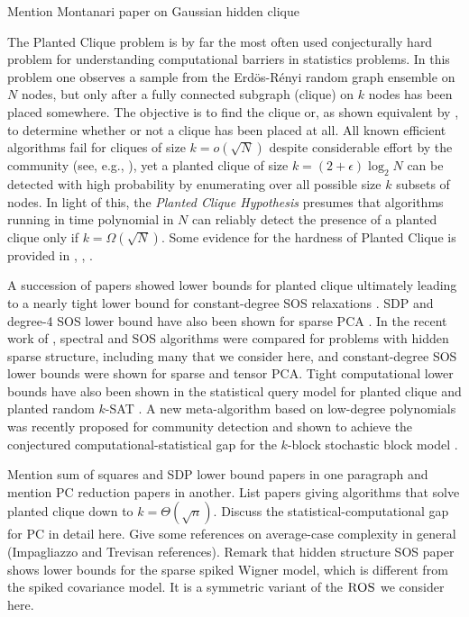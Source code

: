 \documentclass[11pt]{article}
\begin{document}
Mention Montanari paper on Gaussian hidden clique

The Planted Clique problem is by far the most often used conjecturally hard problem for understanding computational barriers in statistics problems. In this problem one observes a sample from the Erd\"{o}s-R\'{e}nyi random graph ensemble on $N$ nodes, but only after a fully connected subgraph (clique) on $k$ nodes has been placed somewhere. The objective is to find the clique or, as shown equivalent by \cite{alon2007testing}, to determine whether or not a clique has been placed at all. All known efficient algorithms fail for cliques of size $k=o(\sqrt{N})$ despite considerable effort by the community (see, e.g., \cite{alon1998finding,deshpande2015finding}), yet a planted clique of size $k = (2+\epsilon)\log_2 N$ can be detected with high probability by enumerating over all possible size $k$ subsets of nodes. In light of this, the \emph{Planted Clique Hypothesis} presumes that algorithms running in time polynomial in $N$ can reliably detect the presence of a planted clique only if $k = \Omega(\sqrt{ N})$. Some evidence for the hardness of Planted Clique is provided in \cite{feldman2013statistical}, \cite{deshpande2015improved}, \cite{barak2016nearly}.

A succession of papers showed lower bounds for planted clique ultimately leading to a nearly tight lower bound for constant-degree SOS relaxations \cite{raghavendra2015tight, meka2015sum, deshpande2015improved, hopkins2016integrality, barak2016nearly}. SDP and degree-4 SOS lower bound have also been shown for sparse PCA \cite{krauthgamer2015semidefinite, ma2015sum}. In the recent work of \cite{hopkins2017power}, spectral and SOS algorithms were compared for problems with hidden sparse structure, including many that we consider here, and constant-degree SOS lower bounds were shown for sparse and tensor PCA. Tight computational lower bounds have also been shown in the statistical query model for planted clique and planted random $k$-SAT \cite{feldman2012statistical, feldman2015complexity}. A new meta-algorithm based on low-degree polynomials was recently proposed for community detection and shown to achieve the conjectured computational-statistical gap for the $k$-block stochastic block model \cite{hopkins2017bayesian}.

Mention sum of squares and SDP lower bound papers in one paragraph and mention PC reduction papers in another. List papers giving algorithms that solve planted clique down to $k = \Theta(\sqrt{n})$. Discuss the statistical-computational gap for PC in detail here. Give some references on average-case complexity in general (Impagliazzo and Trevisan references). Remark that hidden structure SOS paper shows lower bounds for the sparse spiked Wigner model, which is different from the spiked covariance model. It is a symmetric variant of the $\textsc{ROS}$ we consider here.
\end{document}

